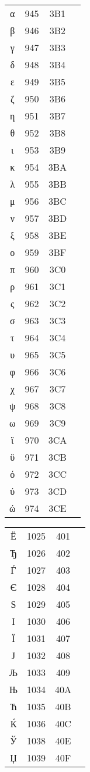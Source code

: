 \documentclass[10pt]{article}
\begin{document}
\begin{tabular}{crcl}
α&945&3B1&\\
β&946&3B2&\\
γ&947&3B3&\\
δ&948&3B4&\\
ε&949&3B5&\\
ζ&950&3B6&\\
η&951&3B7&\\
θ&952&3B8&\\
ι&953&3B9&\\
κ&954&3BA&\\
λ&955&3BB&\\
μ&956&3BC&\\
ν&957&3BD&\\
ξ&958&3BE&\\
ο&959&3BF&\\
π&960&3C0&\\
ρ&961&3C1&\\
ς&962&3C2&\\
σ&963&3C3&\\
τ&964&3C4&\\
υ&965&3C5&\\
φ&966&3C6&\\
χ&967&3C7&\\
ψ&968&3C8&\\
ω&969&3C9&\\
ϊ&970&3CA&\\
ϋ&971&3CB&\\
ό&972&3CC&\\
ύ&973&3CD&\\
ώ&974&3CE&\\
\end{tabular}

\begin{tabular}{crcl}
Ё&1025&401&\\
Ђ&1026&402&\\
Ѓ&1027&403&\\
Є&1028&404&\\
Ѕ&1029&405&\\
І&1030&406&\\
Ї&1031&407&\\
Ј&1032&408&\\
Љ&1033&409&\\
Њ&1034&40A&\\
Ћ&1035&40B&\\
Ќ&1036&40C&\\
Ў&1038&40E&\\
Џ&1039&40F&\\
\end{tabular}
\end{document}
